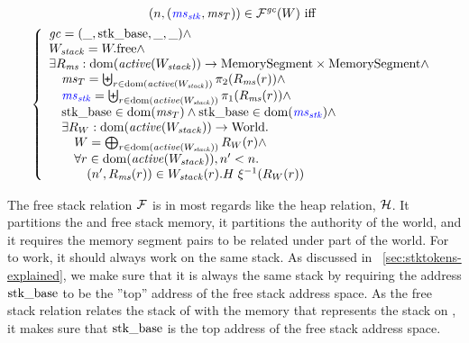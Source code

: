 \begin{jversion}
\begin{definition}
\label{def:free-stack-rel}
  \begin{multline*}
    \memSatFStack{\src{\ms_\stk},\ms_T}{W} \text{ iff } \\
    \left\{
      \begin{array}{l}
        \gc = (\_,\stkb,\_,\_) \wedge\\
        W_\var{stack} = \pwfree \wedge \\
        \exists R_\ms : \dom(\activeReg{W_\var{stack}}) \fun \MemSeg \times \MemSeg \wedge \\
        \quad \ms_T = \biguplus_{r \in \dom(\activeReg{W_\var{stack}})} \pi_2(R_\ms(r)) \wedge \\
        \quad \src{\ms_\stk} = \biguplus_{r \in \dom(\activeReg{W_\var{stack}})} \pi_1(R_\ms(r)) \wedge \\
        \quad \stkb \in \dom(\ms_T) \wedge \stkb \in \dom(\src{\ms_\stk}) \wedge \\
        \quad \exists R_W : \dom(\activeReg{W_\var{stack}}) \fun \World\ldotp\\
        \qquad W = \bigoplus_{r \in \dom(\activeReg{W_\var{stack}})} R_W(r) \wedge\\
        \qquad \forall r \in \dom(\activeReg{W_\var{stack}}),n' < n \ldotp \\
        \qquad \quad \npair[n']{R_\ms(r)} \in  W_\var{stack}(r).H \; \xi^{-1}(R_W(r))
      \end{array}
    \right.
  \end{multline*}
\end{definition}
The free stack relation $\lrfree[]$ is in most regards like the heap relation, $\lrhname{}$.
It partitions the \srccm{} and \trgcm{} free stack memory, it partitions the authority of the world, and it requires the memory segment pairs to be related under part of the world.
For \stktokens{} to work, it should always work on the same stack.
As discussed in \sectionname~\ref{sec:stktokens-explained}, we make sure that it is always the same stack by requiring the address $\stkb$ to be the ''top'' address of the free stack address space.
As the free stack relation relates the stack of \srccm{} with the memory that represents the stack on \trgcm{}, it makes sure that $\stkb$ is the top address of the free stack address space.


\end{jversion}
